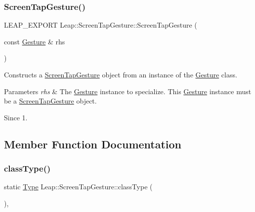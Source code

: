 \subsubsection{\texorpdfstring{Screen\+Tap\+Gesture()}{ScreenTapGesture()}\hspace{0.1cm}{\footnotesize\ttfamily [2/2]}}
{\footnotesize\ttfamily L\+E\+A\+P\+\_\+\+E\+X\+P\+O\+RT Leap\+::\+Screen\+Tap\+Gesture\+::\+Screen\+Tap\+Gesture (\begin{DoxyParamCaption}\item[{const \hyperlink{class_leap_1_1_gesture}{Gesture} \&}]{rhs }\end{DoxyParamCaption})}

Constructs a \hyperlink{class_leap_1_1_screen_tap_gesture}{Screen\+Tap\+Gesture} object from an instance of the \hyperlink{class_leap_1_1_gesture}{Gesture} class.


\begin{DoxyCodeInclude}
\end{DoxyCodeInclude}



\begin{DoxyParams}{Parameters}
{\em rhs} & The \hyperlink{class_leap_1_1_gesture}{Gesture} instance to specialize. This \hyperlink{class_leap_1_1_gesture}{Gesture} instance must be a \hyperlink{class_leap_1_1_screen_tap_gesture}{Screen\+Tap\+Gesture} object. \\
\hline
\end{DoxyParams}
\begin{DoxySince}{Since}
1. 
\end{DoxySince}


\subsection{Member Function Documentation}
\mbox{\label{class_leap_1_1_screen_tap_gesture_ae967e0ad37fc48faa25044b4a9977f25}} 
\subsubsection{\texorpdfstring{class\+Type()}{classType()}}
{\footnotesize\ttfamily static \hyperlink{class_leap_1_1_gesture_a6fa6dd4f28c502f0d55abc6b71c6f9b1}{Type} Leap\+::\+Screen\+Tap\+Gesture\+::class\+Type (\begin{DoxyParamCaption}{ }\end{DoxyParamCaption})\hspace{0.3cm}{\ttfamily [inline]}, {\ttfamily [static]}}

